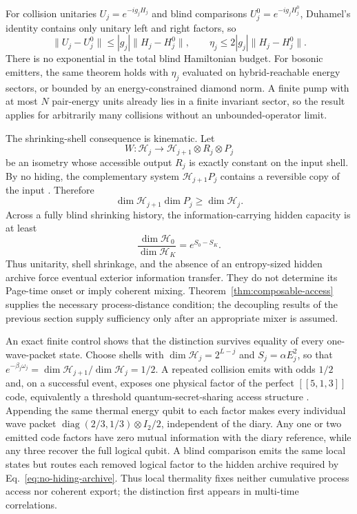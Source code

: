 \documentclass[11pt]{article}
\newcommand{\cH}{\mathcal H}
\begin{document}
For collision unitaries $U_j=e^{-ig_jH_j}$ and blind comparisons
$U_j^0=e^{-ig_jH_j^0}$, Duhamel's identity contains only unitary left and right
factors, so
\begin{equation}
  \lVert U_j-U_j^0\rVert
  \le |g_j|\lVert H_j-H_j^0\rVert,
  \qquad
  \eta_j\le2|g_j|\lVert H_j-H_j^0\rVert.
\end{equation}
There is no exponential in the total blind Hamiltonian budget.  For bosonic
emitters, the same theorem holds with $\eta_j$ evaluated on hybrid-reachable
energy sectors, or bounded by an energy-constrained diamond norm.  A finite
pump with at most $N$ pair-energy units already lies in a finite invariant
sector, so the result applies for arbitrarily many collisions without an
unbounded-operator limit.

The shrinking-shell consequence is kinematic.  Let
\begin{equation}
  W:\cH_j\longrightarrow\cH_{j+1}\otimes R_j\otimes P_j
\end{equation}
be an isometry whose accessible output $R_j$ is exactly constant on the input
shell.  By no hiding, the complementary system $\cH_{j+1}P_j$ contains a
reversible copy of the input \citep{BraunsteinPati2007NoHiding}.  Therefore
\begin{equation}
  \dim\cH_{j+1}\dim P_j\ge\dim\cH_j.
  \label{eq:no-hiding-archive}
\end{equation}
Across a fully blind shrinking history, the information-carrying hidden
capacity is at least
\begin{equation}
  \frac{\dim\cH_0}{\dim\cH_K}
  =e^{S_0-S_K}.
\end{equation}
Thus unitarity, shell shrinkage, and the absence of an entropy-sized hidden
archive force eventual exterior information transfer.  They do not determine
its Page-time onset or imply coherent mixing.  Theorem~\ref{thm:composable-access}
supplies the necessary process-distance condition; the decoupling results of
the previous section supply sufficiency only after an appropriate mixer is
assumed.

An exact finite control shows that the distinction survives equality of every
one-wave-packet state.  Choose shells with
$\dim\cH_j=2^{L-j}$ and $S_j=\alpha E_j^2$, so that
$e^{-\beta_j\omega_j}=\dim\cH_{j+1}/\dim\cH_j=1/2$.
A repeated collision emits with odds $1/2$ and, on a successful event, exposes
one physical factor of the perfect $[[5,1,3]]$ code, equivalently a threshold
quantum-secret-sharing access structure \citep{CleveGottesmanLo1999}.
Appending the same thermal
energy qubit to each factor makes every individual wave packet
$\operatorname{diag}(2/3,1/3)\otimes I_2/2$, independent of the diary.  Any one
or two emitted code factors have zero mutual information with the diary
reference, while any three recover the full logical qubit.  A blind comparison
emits the same local states but routes each removed logical factor to the
hidden archive required by Eq.~\eqref{eq:no-hiding-archive}.  Thus local
thermality fixes neither cumulative process access nor coherent export; the
distinction first appears in multi-time correlations.
\end{document}
